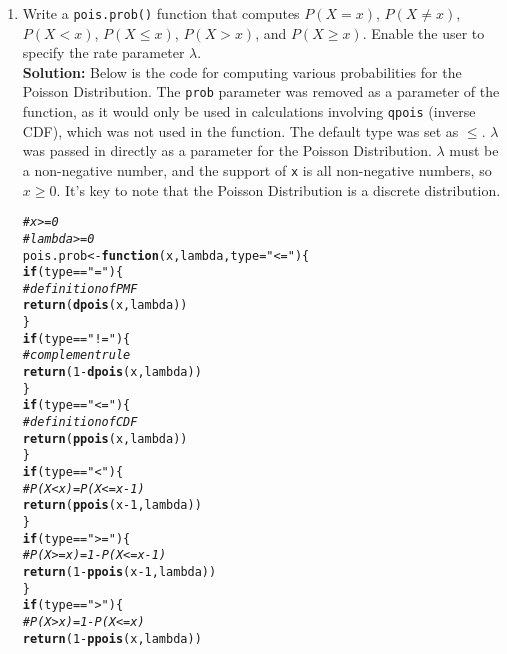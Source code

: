 \documentclass{article}\usepackage[]{graphicx}\usepackage[]{xcolor}
\makeatletter
\newcommand{\hlnum}[1]{\textcolor[rgb]{0.686,0.059,0.569}{#1}}%
\newcommand{\hlsng}[1]{\textcolor[rgb]{0.192,0.494,0.8}{#1}}%
\newcommand{\hlcom}[1]{\textcolor[rgb]{0.678,0.584,0.686}{\textit{#1}}}%
\newcommand{\hlopt}[1]{\textcolor[rgb]{0,0,0}{#1}}%
\newcommand{\hldef}[1]{\textcolor[rgb]{0.345,0.345,0.345}{#1}}%
\newcommand{\hlkwa}[1]{\textcolor[rgb]{0.161,0.373,0.58}{\textbf{#1}}}%
\newcommand{\hlkwb}[1]{\textcolor[rgb]{0.69,0.353,0.396}{#1}}%
\newcommand{\hlkwc}[1]{\textcolor[rgb]{0.333,0.667,0.333}{#1}}%
\newcommand{\hlkwd}[1]{\textcolor[rgb]{0.737,0.353,0.396}{\textbf{#1}}}%
\newenvironment{kframe}{%
 \def\at@end@of@kframe{}%
 \ifinner\ifhmode%
  \def\at@end@of@kframe{\end{minipage}}%
  \begin{minipage}{\columnwidth}%
 \fi\fi%
 \def\FrameCommand##1{\hskip\@totalleftmargin \hskip-\fboxsep
 \colorbox{shadecolor}{##1}\hskip-\fboxsep
     \hskip-\linewidth \hskip-\@totalleftmargin \hskip\columnwidth}%
 \MakeFramed {\advance\hsize-\width
   \@totalleftmargin\z@ \linewidth\hsize
   \@setminipage}}%
 {\par\unskip\endMakeFramed%
 \at@end@of@kframe}
\newenvironment{knitrout}{}{} %
\makeatother
\begin{document}
  \begin{enumerate}
    \item Write a \texttt{pois.prob()} function that computes $P(X=x)$, 
    $P(X \neq x)$, $P(X<x)$, $P(X \leq x)$, $P(X > x)$, and $P(X \geq x).$ Enable the user to specify the rate parameter $\lambda$. \\
    \textbf{Solution:} Below is the code for computing various probabilities for the Poisson Distribution. The \texttt{prob} parameter was removed as a parameter of the function, as it would only be used in calculations involving \texttt{qpois} (inverse CDF), which was not used in the function. The default type was set as $\leq$. $\lambda$ was passed in directly as a parameter for the Poisson Distribution. $\lambda$ must be a non-negative number, and the support of \texttt{x} is all non-negative numbers, so $x \geq 0$. It's key to note that the Poisson Distribution is a discrete distribution. 
\begin{knitrout}\scriptsize
{}\color{fgcolor}\begin{kframe}
\begin{alltt}
\hlcom{# x >= 0 }
\hlcom{# lambda >= 0}
\hldef{pois.prob} \hlkwb{<-} \hlkwa{function}\hldef{(}\hlkwc{x}\hldef{,} \hlkwc{lambda}\hldef{,} \hlkwc{type}\hldef{=}\hlsng{"<="}\hldef{)\{}
  \hlkwa{if} \hldef{(type} \hlopt{==} \hlsng{"="}\hldef{)\{}
    \hlcom{# definition of PMF}
    \hlkwd{return}\hldef{(}\hlkwd{dpois}\hldef{(x, lambda))}
  \hldef{\}}
  \hlkwa{if} \hldef{(type} \hlopt{==} \hlsng{"!="}\hldef{)\{}
    \hlcom{# complement rule}
    \hlkwd{return}\hldef{(}\hlnum{1}\hlopt{-}\hlkwd{dpois}\hldef{(x, lambda))}
  \hldef{\}}
  \hlkwa{if}\hldef{(type} \hlopt{==} \hlsng{"<="}\hldef{)\{}
    \hlcom{# definition of CDF}
    \hlkwd{return}\hldef{(}\hlkwd{ppois}\hldef{(x, lambda))}
  \hldef{\}}
  \hlkwa{if} \hldef{(type} \hlopt{==} \hlsng{"<"}\hldef{)\{}
    \hlcom{# P(X < x) = P(X <= x-1)}
    \hlkwd{return}\hldef{(}\hlkwd{ppois}\hldef{(x}\hlopt{-}\hlnum{1}\hldef{, lambda))}
  \hldef{\}}
  \hlkwa{if} \hldef{(type} \hlopt{==} \hlsng{">="}\hldef{)\{}
    \hlcom{# P(X >= x) = 1 - P(X <= x-1)}
    \hlkwd{return}\hldef{(}\hlnum{1}\hlopt{-}\hlkwd{ppois}\hldef{(x}\hlopt{-}\hlnum{1}\hldef{, lambda))}
  \hldef{\}}
  \hlkwa{if} \hldef{(type} \hlopt{==} \hlsng{">"}\hldef{)\{}
    \hlcom{# P(X > x) = 1 - P(X <= x)}
    \hlkwd{return}\hldef{(}\hlnum{1}\hlopt{-}\hlkwd{ppois}\hldef{(x, lambda))}

\end{alltt}
\end{kframe}
\end{knitrout}
\end{enumerate}
\end{document}
